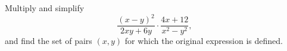 Multiply and simplify
\[\dfrac{(x-y)^2}{2xy+6y}\cdot\dfrac{4x+12}{x^2-y^2},\]
and find the set of pairs $(x,y)$ for which the original expression is defined.
